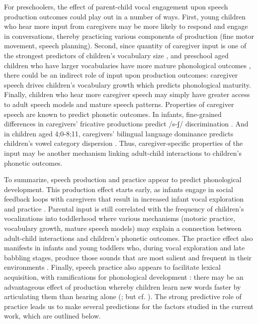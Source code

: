 \documentclass[a4paper,man,natbib,donotrepeattitle, apacite]{apa6}
\begin{document}
For preschoolers, the effect of parent-child vocal engagement upon speech production outcomes could play out in a number of ways. First, young children who hear more input from caregivers may be more likely to respond and engage in conversations, thereby practicing various components of production (fine motor movement, speech planning). Second, since quantity of caregiver input is one of the strongest predictors of children’s vocabulary size \cite{hoffSpecificityEnvironmentalInfluence2003}, and preschool aged children who have larger vocabularies have more mature phonological outcomes \cite{stoel-gammonRelationshipsLexicalPhonological2011,storkelLexiconPhonologyInteractions2002}, there could be an indirect role of input upon production outcomes: caregiver speech drives children’s vocabulary growth which predicts phonological maturity. Finally, children who hear more caregiver speech may simply have greater access to adult speech models and mature speech patterns. Properties of caregiver speech are known to predict phonetic outcomes. In infants, fine-grained differences in caregivers’ fricative productions predict /s-ʃ/ discrimination \cite{cristiaFinegrainedVariationCaregivers2011}. And in children aged 4;0-8;11, caregivers’ bilingual language dominance predicts children’s vowel category dispersion \cite{cychoszPhoneticDevelopmentAgglutinating2020}. Thus, caregiver-specific properties of the input may be another mechanism linking adult-child interactions to children’s phonetic outcomes.

To summarize, speech production and practice appear to predict phonological development. This production effect starts early, as infants engage in social feedback loops with caregivers that result in increased infant vocal exploration and practice \cite{franklinEffectsParentalInteraction2014,goldsteinSocialFeedbackInfants2008,mcgillionWhatPavesWay2017,pretzerInfantadultVocalInteraction2019,warlaumontSocialFeedbackLoop2014}. Parental input is still correlated with the frequency of children’s vocalizations into toddlerhood 
\cite{gilkersonImpactAdultTalk2009,weislederTalkingChildrenMatters2013} where various mechanisms (motoric practice, vocabulary growth, mature speech models) may explain a connection between adult-child interactions and children's phonetic outcomes. The practice effect also manifests in infants and young toddlers who, during vocal exploration and late babbling stages, produce those sounds that are most salient and frequent in their environments \cite{depaolisProductionPatternsInfluence2011,depaolisInfluenceBabblingPatterns2013,laingBabbleWordsInfants2020,vihmanVariablePathsEarly1993,vihmanLearningWordsLearning2017}. Finally, speech practice also appears to facilitate lexical acquisition, with ramifications for phonological development \cite{sosaLexicalPhonologicalEffects2012,stoel-gammonRelationshipsLexicalPhonological2011,zamunerPhonotacticProbabilitiesOnset2009}: there may be an advantageous effect of production whereby children learn new words faster by articulating them than hearing alone (; but cf. ). The strong predictive role of practice leads us to make several predictions for the factors studied in the current work, which are outlined below. 
\end{document}
